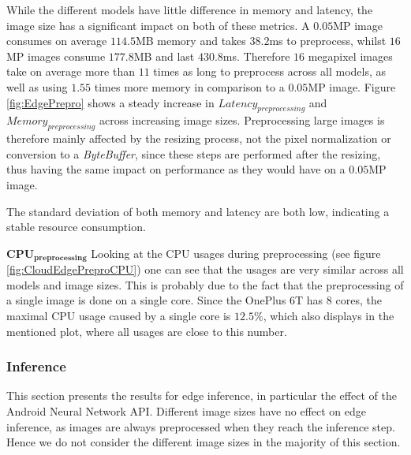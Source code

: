 While the different models have little difference in memory and latency, the image size has a significant impact on both of these metrics.
A $0.05$MP image consumes on average $114.5$MB memory and takes $38.2$ms to preprocess, whilst  $16$MP images consume $177.8$MB and last $430.8$ms.
Therefore $16$ megapixel images take on average more than $11$ times as long to preprocess across all models, as well as using $1.55$ times more memory in comparison to a $0.05$MP image.
Figure \ref{fig:EdgePrepro} shows a steady increase in $Latency_{preprocessing}$ and $Memory_{preprocessing}$ across increasing image sizes.
Preprocessing large images is therefore mainly affected by the resizing process, not the pixel normalization or conversion to a \emph{ByteBuffer}, since these steps are performed after the resizing, thus having the same impact on performance as they would have on a $0.05$MP image.

The standard deviation of both memory and latency are both low, indicating a stable resource consumption.




$\mathbf{CPU_{preprocessing}}$
Looking at the CPU usages during preprocessing (see figure \ref{fig:CloudEdgePreproCPU}) one can see that the usages are very similar across all models and image sizes. This is probably due to the fact that the preprocessing of a single image is done on a single core. Since the OnePlus 6T has $8$ cores, the maximal CPU usage caused by a single core is $12.5\%$, which also displays in the mentioned plot, where all usages are close to this number.

\FloatBarrier
\subsubsection{Inference}
This section presents the results for edge inference, in particular the effect of the Android Neural Network API.
Different image sizes have no effect on edge inference, as images are always preprocessed when they reach the inference step.
Hence we do not consider the different image sizes in the majority of this section.


